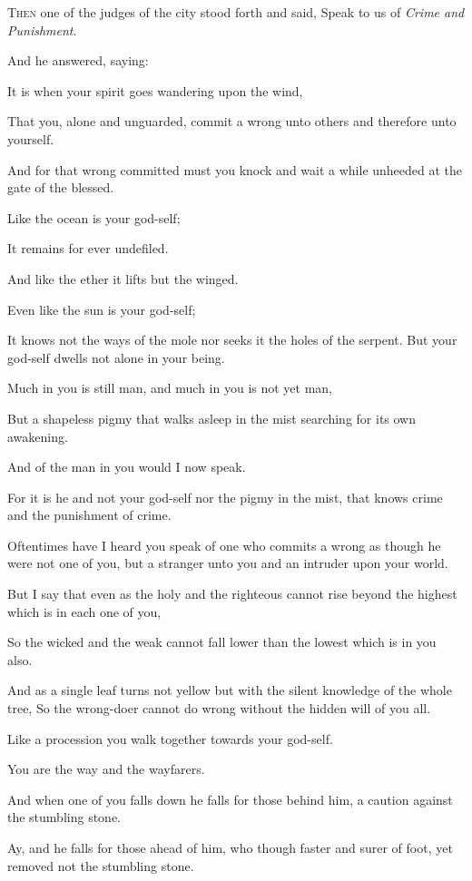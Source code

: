 
\lettrine{T}{hen} one of the judges of the city
stood forth and said, Speak to us of
\textit{Crime and Punishment}.

\medskip
And he answered, saying:

It is when your spirit goes wandering
upon the wind,

That you, alone and unguarded, commit
a wrong unto others and therefore unto
yourself.

And for that wrong committed must you
knock and wait a while unheeded at the
gate of the blessed.

Like the ocean is your god-self;

It remains for ever undefiled.

And like the ether it lifts but the
winged.

Even like the sun is your god-self;

It knows not the ways of the mole nor
seeks it the holes of the serpent.
But your god-self dwells not alone
in your being.

Much in you is still man, and much in
you is not yet man,

But a shapeless pigmy that walks asleep
in the mist searching for its own
awakening.

And of the man in you would I now speak.

For it is he and not your god-self nor
the pigmy in the mist, that knows crime
and the punishment of crime.



Oftentimes have I heard you speak of one
who commits a wrong as though he were
not one of you, but a stranger unto you
and an intruder upon your world.

But I say that even as the holy and the
righteous cannot rise beyond the highest
which is in each one of you,

So the wicked and the weak cannot fall
lower than the lowest which is in you
also.

And as a single leaf turns not yellow
but with the silent knowledge of the
whole tree, So the wrong-doer cannot
do wrong without the hidden will of you
all.

Like a procession you walk together
towards your god-self.

You are the way and the wayfarers.

And when one of you falls down he falls
for those behind him, a caution against
the stumbling stone.

Ay, and he falls for those ahead of him,
who though faster and surer of foot, yet
removed not the stumbling stone.

